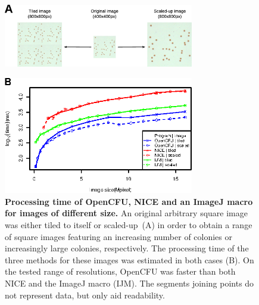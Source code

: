 \documentclass[10pt]{article}
\newcommand{\IJM}{IJM}
\begin{document}
\newpage{}


\begin{figure}[!ht]

\begin{center}
\includegraphics[width=3.27in]{./fig3A.eps}\\
\end{center}
\begin{center}
\includegraphics[width=3.27in]{./fig3B.eps}
\end{center}
\caption{{\bf Processing time of OpenCFU, NICE\cite{clarke_lowcost_2010} and an ImageJ macro\cite{cai_optimized_2011} for images of
different size.} An original arbitrary square image was either tiled to itself
or scaled-up~(A) in order to obtain a range of square images featuring an
increasing number of colonies or increasingly large colonies, respectively. The
processing time of the three methods for these images was estimated in both cases (B).
On the tested range of resolutions, OpenCFU was faster than both NICE and the ImageJ macro (\IJM). 
The segments joining points do not represent data, but only aid readability.}
\label{figSpeed}
\end{figure}


\newpage{}
\end{document}
